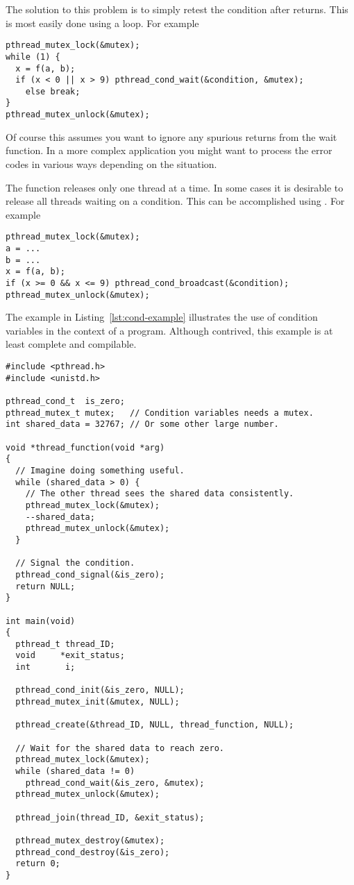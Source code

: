 The solution to this problem is to simply retest the condition after
 returns. This is most easily done using a loop. For example

\begin{lstlisting}
pthread_mutex_lock(&mutex);
while (1) {
  x = f(a, b);
  if (x < 0 || x > 9) pthread_cond_wait(&condition, &mutex);
    else break;
}
pthread_mutex_unlock(&mutex);
\end{lstlisting}

Of course this assumes you want to ignore any spurious returns from the wait function. In a more
complex application you might want to process the error codes in various ways depending on the
situation.

The  function releases only one thread at a time. In some cases
it is desirable to release all threads waiting on a condition. This can be accomplished using
. For example

\begin{lstlisting}
pthread_mutex_lock(&mutex);
a = ...
b = ...
x = f(a, b);
if (x >= 0 && x <= 9) pthread_cond_broadcast(&condition);
pthread_mutex_unlock(&mutex);
\end{lstlisting}

The example in Listing~\ref{lst:cond-example} illustrates the use of condition variables in the
context of a program. Although contrived, this example is at least complete and compilable.

\begin{lstlisting}[float=tp,frame=single,xleftmargin=0in,
  caption={Condition Variable Example},label=lst:cond-example]
#include <pthread.h>
#include <unistd.h>

pthread_cond_t  is_zero;
pthread_mutex_t mutex;   // Condition variables needs a mutex.
int shared_data = 32767; // Or some other large number.

void *thread_function(void *arg)
{
  // Imagine doing something useful.
  while (shared_data > 0) {
    // The other thread sees the shared data consistently.
    pthread_mutex_lock(&mutex);
    --shared_data;
    pthread_mutex_unlock(&mutex);
  }
  
  // Signal the condition.
  pthread_cond_signal(&is_zero);
  return NULL;
}

int main(void)
{
  pthread_t thread_ID;
  void     *exit_status;
  int       i;

  pthread_cond_init(&is_zero, NULL);
  pthread_mutex_init(&mutex, NULL);

  pthread_create(&thread_ID, NULL, thread_function, NULL);

  // Wait for the shared data to reach zero.
  pthread_mutex_lock(&mutex);
  while (shared_data != 0)
    pthread_cond_wait(&is_zero, &mutex);
  pthread_mutex_unlock(&mutex);

  pthread_join(thread_ID, &exit_status);

  pthread_mutex_destroy(&mutex);
  pthread_cond_destroy(&is_zero);
  return 0;
}
\end{lstlisting}

